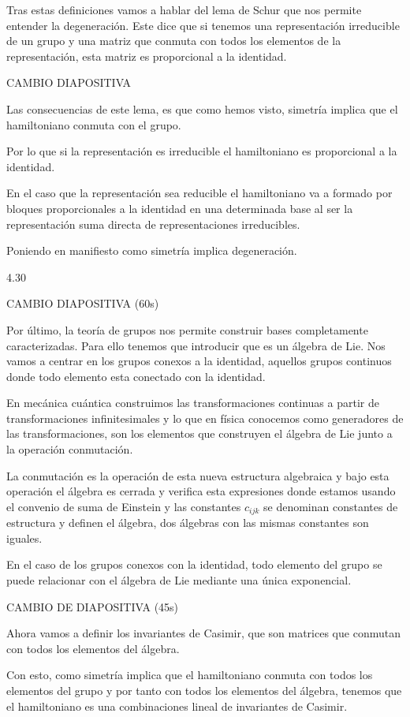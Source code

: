 \documentclass[a4paper,12pt,twoside]{article}
\begin{document}
Tras estas definiciones vamos a hablar del lema de Schur que nos permite entender la degeneración. Este dice que si tenemos una representación irreducible de un grupo y una matriz que conmuta con todos los elementos de la representación, esta matriz es proporcional a la identidad. 


CAMBIO DIAPOSITIVA

Las consecuencias de este lema, es que como hemos visto, simetría implica que el hamiltoniano conmuta con el grupo.

Por lo que si la representación es irreducible el hamiltoniano es proporcional a la identidad.

En el caso que la representación sea reducible el hamiltoniano va a formado por bloques proporcionales a la identidad en una determinada base al ser la representación suma directa de representaciones irreducibles.

Poniendo en manifiesto como simetría implica degeneración.

4.30

CAMBIO DIAPOSITIVA (60s)

Por último, la teoría de grupos nos permite construir bases completamente caracterizadas. Para ello tenemos que introducir que es un álgebra de Lie. Nos vamos a centrar en los grupos conexos a la identidad, aquellos grupos continuos donde todo elemento esta conectado con la identidad.

En mecánica cuántica construimos las transformaciones continuas a partir de transformaciones infinitesimales y lo que en física conocemos como generadores de las transformaciones, son los elementos que construyen el álgebra de Lie junto a la operación conmutación.

La conmutación es la operación de esta nueva estructura algebraica y bajo esta operación el álgebra es cerrada y verifica esta expresiones donde estamos usando el convenio de suma de Einstein y las constantes $c_{ijk}$ se denominan constantes de estructura y definen el álgebra, dos álgebras con las mismas constantes son iguales.

En el caso de los grupos conexos con la identidad, todo elemento del grupo se puede relacionar con el álgebra de Lie mediante una única exponencial.

CAMBIO DE DIAPOSITIVA (45s)

Ahora vamos a definir los invariantes de Casimir, que son matrices que conmutan con todos los elementos del álgebra.

Con esto, como simetría implica que el hamiltoniano conmuta con todos los elementos del grupo y por tanto con todos los elementos del álgebra, tenemos que el hamiltoniano es una combinaciones lineal de invariantes de Casimir.
\end{document}

